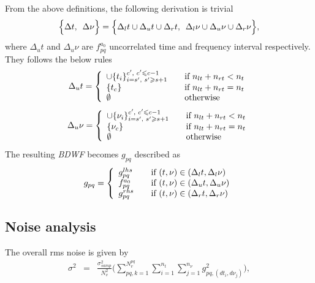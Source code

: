 \documentclass[useAMS,usenatbib]{mn2e}
\begin{document}
From the above definitions, the following derivation is trivial 
\begin{equation*}
 \Big\{\Delta t,\hspace{0.17cm}\Delta \nu \Big\}=\Big\{\Delta_l t \cup \Delta_u t \cup \Delta_r t, \hspace{0.17cm}\Delta_l \nu \cup 
\Delta_u \nu \cup \Delta_r \nu \Big\},
\end{equation*}
where $\Delta_u t$ and $\Delta_u \nu$ are $f_{pq}^{a_0}$ uncorrelated time  and frequency interval respectively. They follows the below 
rules 
\begin{eqnarray*}
 \Delta_u t= \left\{ 
  \begin{array}{l l}
     \cup\{t_i\}_{i=s',\hspace{0.1cm} s' \geq s+1}^{c', \hspace{0.1cm}c'\leq c-1} & \quad \text{if $n_{lt}+n_{rt}< n_t$}\\
      \{t_c\}& \quad \text{if $n_{lt}+n_{rt} = n_t$}\\
       \emptyset  & \quad \text{otherwise}
  \end{array} \right.
\end{eqnarray*}
\begin{eqnarray*}
 \Delta_u \nu= \left\{ 
  \begin{array}{l l}
     \cup\{\nu_i\}_{i=s',\hspace{0.1cm} s'\geq s+1}^{c', \hspace{0.1cm}c'\leq c-1} & \quad \text{if $n_{lt}+n_{rt} < n_t$}\\
      \{\nu_c\}& \quad \text{if $n_{lt}+n_{rt} = n_t$}\\
       \emptyset  & \quad \text{otherwise}
  \end{array} \right.
\end{eqnarray*}
The resulting \textit{BDWF} becomes $g_{pq}$ described as
\begin{eqnarray*}
g_{pq} = \left\{ 
  \begin{array}{l l}
    g^{lhs}_{pq} & \quad \text{if $(t,\nu) \in (\Delta_l t, \Delta_l \nu)$}\\
    f^{a_0}_{pq} & \quad \text{if $(t,\nu) \in (\Delta_u t, \Delta_u \nu)$}\\
    g^{rhs}_{pq}& \quad \text{if $(t,\nu) \in (\Delta_r t, \Delta_r \nu)$}
  \end{array} \right.
\end{eqnarray*}
\subsection{Noise analysis}
The  overall rms noise is given by
\begin{eqnarray*}
\sigma^2	&=& 
\frac{\sigma^{2}_{samp} }{N_{v}^{2}}\Big(\sum_{pq,k=1}^{N_{v}^{pq}}\sum_{i=1}^{n_t}\sum_{j=1}^{n_{\nu}}g_{pq,(dt_i,d\nu_j)}^{2}\Big) ,
\end{eqnarray*}
\end{document}
